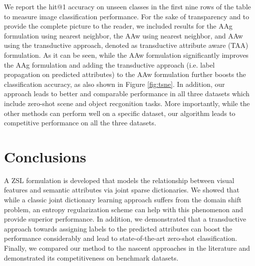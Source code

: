 \documentclass[letterpaper]{article} %
\begin{document}
We report the hit@1 accuracy  on unseen classes in the first nine rows of the table to measure image classification performance. For the sake of transparency and to provide the complete picture to the reader, we included results for the AAg formulation using nearest neighbor, the AAw using nearest neighbor, and AAw using the transductive approach, denoted as transductive attribute aware (TAA) formulation. As it can be seen, while the AAw formulation significantly improves the AAg formulation and adding the transductive approach (i.e. label propagation on predicted attributes) to the AAw formulation further boosts the classification accuracy, as also shown in Figure \ref{fig:tsne}.  In addition, our approach leads to better and comparable performance in all three datasets which include zero-shot scene and object recgonition tasks. More importantly, while the other methods can perform well on a specific dataset,  our algorithm leads to competitive performance on all the three datasets.%


\section{Conclusions}
\label{sec:conclusion}
A ZSL formulation is developed that models the relationship between  visual features  and semantic attributes via joint sparse dictionaries. We showed that while a classic joint dictionary learning approach suffers from the domain shift problem, an entropy regularization scheme can help with this phenomenon and provide superior performance. In addition, we demonstrated that a transductive approach towards assigning labels to the predicted attributes can boost the performance considerably and lead to state-of-the-art zero-shot classification.  Finally, we compared our method to the nascent approaches in the literature and demonstrated its competitiveness on benchmark datasets.


\clearpage





 
\end{document}
